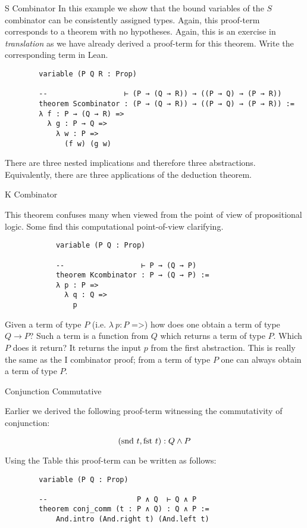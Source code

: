 \documentclass{book}
\begin{document}
    \begin{eg}{S Combinator}
        In this example we show that the bound variables of the $S$ combinator can be consistently assigned types. Again, this proof-term corresponds to a theorem with no hypotheses. Again, this is an exercise in \emph{translation} as we have already derived a proof-term for this theorem. Write the corresponding term in Lean. 

        \begin{lstlisting}
        variable (P Q R : Prop)

        --                  ⊢ (P → (Q → R)) → ((P → Q) → (P → R))
        theorem Scombinator : (P → (Q → R)) → ((P → Q) → (P → R)) :=
        λ f : P → (Q → R) =>
          λ g : P → Q =>
            λ w : P =>
              (f w) (g w)
        \end{lstlisting}  
        
        There are three nested implications and therefore three abstractions. Equivalently, there are three applications of the deduction theorem.      
    \end{eg}

    \begin{eg}{K Combinator}

        This theorem confuses many when viewed from the point of view of propositional logic. Some find this computational point-of-view clarifying. 

        \begin{lstlisting}
            variable (P Q : Prop)
            
            --                  ⊢ P → (Q → P)
            theorem Kcombinator : P → (Q → P) :=
            λ p : P =>
              λ q : Q =>
                p
            \end{lstlisting}  

        Given a term of type $P$ (i.e.  $\lambda \ p : P$ =>) how does one obtain a term of type $Q \to P$? Such a term is a function from $Q$ which returns a term of type $P$. Which $P$ does it return? It returns the input $p$ from the first abstraction. This is really the same as the I combinator proof; from a term of type $P$ one can always obtain a term of type $P$.
    \end{eg}

    \begin{eg}{Conjunction Commutative}

        Earlier we derived the following proof-term witnessing the commutativity of conjunction:

        $$ (\text{snd} \ t, \text{fst} \ t) : Q \land P $$

        Using the Table this proof-term can be written as follows:

        \begin{lstlisting}
        variable (P Q : Prop)

        --                     P ∧ Q  ⊢ Q ∧ P
        theorem conj_comm (t : P ∧ Q) : Q ∧ P :=
            And.intro (And.right t) (And.left t)
        \end{lstlisting}        
    \end{eg}
\end{document}
